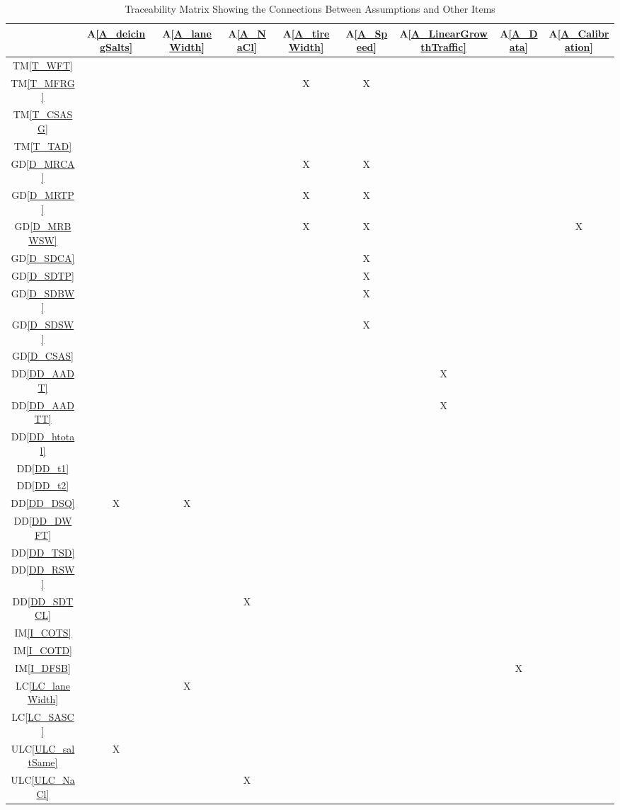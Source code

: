 \documentclass[12pt]{article}
\newcommand{\dref}[1]{GD\ref{#1}}
\newcommand{\ddref}[1]{DD\ref{#1}}
\newcommand{\tref}[1]{TM\ref{#1}}
\newcommand{\aref}[1]{A\ref{#1}}
\newcommand{\iref}[1]{IM\ref{#1}}
\newcommand{\lcref}[1]{LC\ref{#1}}
\newcommand{\ulcref}[1]{ULC\ref{#1}}
\begin{document}
\noindent
\begin{table}[H]
\centering
\begin{tabular}{|c|c|c|c|c|c|c|c|c|}
\hline
	& \aref{A_deicingSalts}& \aref{A_laneWidth}& \aref{A_NaCl} & \aref{A_tireWidth} & \aref{A_Speed} & \aref{A_LinearGrowthTraffic} & \aref{A_Data} & \aref{A_Calibration} \\
\hline
\tref{T_WFT}       & & & & & &  & &   \\ \hline
\tref{T_MFRG}      & & & & X & X & &  &  \\ \hline
\tref{T_CSASG}        & & & & &  & &  & \\ \hline
\tref{T_TAD}        & & & & &  & & &\\ \hline
\dref{D_MRCA}          & & & & X & X  & &  &  \\ \hline
\dref{D_MRTP}          & & & & X & X  & &  &  \\ \hline
\dref{D_MRBWSW}          & & & & X & X  & &  & X  \\ \hline
\dref{D_SDCA}            & & & & & X  & &  &  \\ \hline
\dref{D_SDTP}            & & & & & X  & &  &  \\ \hline
\dref{D_SDBW}            & & & & & X  & &  &  \\ \hline
\dref{D_SDSW}            & & & & & X  & &  &  \\ \hline
\dref{D_CSAS}       & & & & &  & & & \\ \hline
\ddref{DD_AADT}  & & & & & & X &  & \\ \hline
\ddref{DD_AADTT}  & & & & &  & X & & \\ \hline
\ddref{DD_htotal}  & & & & & & &  & \\ \hline
\ddref{DD_t1}  & & & & & &  & & \\ \hline
\ddref{DD_t2}  & & & & & &  & & \\ \hline
\ddref{DD_DSQ}   & X & X & &   &  & & &  \\ \hline
\ddref{DD_DWFT}    & & & & & &  & & \\ \hline
\ddref{DD_TSD}    & & & & & & &  & \\ \hline
\ddref{DD_RSW}    & & & & & & &  & \\ \hline
\ddref{DD_SDTCL}    & & & X &  & & & &\\ \hline
\iref{I_COTS}       & & & & & & & &  \\ \hline
\iref{I_COTD}       & & & & & &  & & \\ \hline
\iref{I_DFSB}       & & & & &  & & X & \\ \hline
\lcref{LC_laneWidth}     & & X & &  & & &  & \\ \hline
\lcref{LC_SASC}   & & & & & &  & & \\ \hline
\ulcref{ULC_saltSame}   & X & & &  & & &  &\\ \hline
\ulcref{ULC_NaCl}   & & & X &  & & &  & \\ \hline

\hline
\end{tabular}
\caption{Traceability Matrix Showing the Connections Between Assumptions and Other Items}
\label{Table:A_others}
\end{table}
\end{document}
